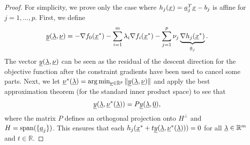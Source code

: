 \begin{proof}
For simplicity, we prove only the case where $h_j (\underline{x}) = \underline{a}_j^T \underline{x} - b_j$ is affine for $j=1,\ldots,p$.
First, we define 
\[ \underline{y} (\underline{\lambda},\underline{\nu}) = -\nabla f_0 (\underline{x}^*) - \sum_{i=1}^m \lambda_i \nabla f_i (\underline{x}^*) - \sum_{j=1}^p \nu_j \underbrace{\nabla h_j (\underline{x}^*)}_{\underline{a}_j}. \]
The vector $\underline{y} (\underline{\lambda},\underline{\nu})$ can be seen as the residual of the descent direction for the objective function after the constraint gradients have been used to cancel some parts.
Next, we let $\underline{\nu}^* (\underline{\lambda}) = \arg \min_{\underline{\nu}\in \mathbb{R}^p} \| \underline{y} (\underline{\lambda},\underline{\nu}) \|$
and apply the best approximation theorem (for the standard inner product space) to see that
\[ \underline{y} (\underline{\lambda},\underline{\nu}^* (\underline{\lambda})) = P \underline{y} (\underline{\lambda},\underline{0}), \]
where the matrix $P$ defines an orthogonal projection onto $H^\perp$ and $H = \mathrm{span} ( \{ \underline{a}_j \} )$.
This ensures that each $h_j ( \underline{x}^* + t \underline{y} (\underline{\lambda},\underline{\nu}^* (\underline{\lambda})) )=0$ for all $\underline{\lambda}\in \mathbb{R}^m$ and $t\in \mathbb{R}$.


\end{proof}
